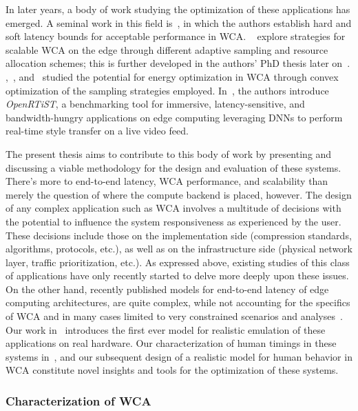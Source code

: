 In later years, a body of work studying the optimization of these applications has emerged.
A seminal work in this field is~\cite{chen2017empirical}, in which the authors establish hard and soft latency bounds for acceptable performance in \gls{WCA}.
\citeauthor{wang2019towards}~\cite{wang2019towards} explore strategies for scalable \gls{WCA} on the edge through different adaptive sampling and resource allocation schemes;
this is further developed in the authors' PhD thesis later on~\cite{wang2020scaling}.
\cite{moothedath2021energy},\ \cite{moothedath2022energy1}, and~\cite{moothedath2022energy2} studied the potential for energy optimization in \gls{WCA} through convex optimization of the sampling strategies employed.
In~\cite{george2020openrtist}, the authors introduce \emph{OpenRTiST}, a benchmarking tool for immersive, latency-sensitive, and bandwidth-hungry applications on edge computing leveraging \glspl{DNN} to perform real-time style transfer on a live video feed.

The present thesis aims to contribute to this body of work by presenting and discussing a viable methodology for the design and evaluation of these systems.
There's more to end-to-end latency, \gls{WCA} performance, and scalability than merely the question of where the compute backend is placed, however.
The design of any complex application such as \gls{WCA} involves a multitude of decisions with the potential to influence the system responsiveness as experienced by the user.
These decisions include those on the implementation side (compression standards, algorithms, protocols, etc.), as well as on the infrastructure side (physical network layer, traffic prioritization, etc.).
As expressed above, existing studies of this class of applications have only recently started to delve more deeply upon these issues.
On the other hand, recently published models for end-to-end latency of edge computing architectures, are quite complex, while not accounting for the specifics of \gls{WCA} and in many cases limited to very constrained scenarios and analyses~\cite{al_zubaidy2015performance,schiessl2017finite}.
Our work in~\cite{olguinmunoz2018demoscaling,olguinmunoz2019edgedroid} introduces the first ever model for realistic emulation of these applications on real hardware.
Our characterization of human timings in these systems in~\cite{olguinmunoz2021impact}, and our subsequent design of a realistic model for human behavior in \gls{WCA} constitute novel insights and tools for the optimization of these systems.

\subsubsection{Characterization of \acs{WCA}}

